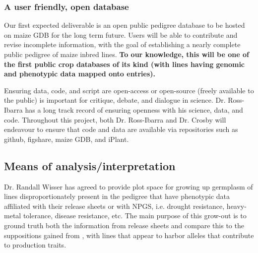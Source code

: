 \documentclass[12pt]{article}
\begin{document}
\subsubsection*{A user friendly, open database}

Our first expected deliverable is an open public pedigree database to be hosted on maize GDB for the long term future. Users will be able to contribute and revise incomplete information, with the goal of establishing a nearly complete public pedigree of maize inbred lines. \textbf{To our knowledge, this will be one of the first public crop databases of its kind (with lines having genomic and phenotypic data mapped onto entries).}
\par Ensuring data, code, and script are open-access or open-source (freely available to the public) is important for critique, debate, and dialogue in science. Dr. Ross-Ibarra has a long track record of ensuring openness with his science, data, and code. Throughout this project, both Dr. Ross-Ibarra and Dr. Crosby will endeavour to ensure that code and data are available via repositories such as github, figshare, maize GDB, and iPlant.


\subsection*{Means of analysis/interpretation}
Dr. Randall Wisser has agreed to provide plot space for growing up germplasm of lines disproportionately present in the pedigree that have phenotypic data affiliated with their release sheets or with NPGS, i.e. drought resistance, heavy-metal tolerance, disease resistance, etc. 
The main purpose of this grow-out is to ground truth both the information from release sheets and compare this to the suppositions gained from \citep{Berg:2014bs}, with lines that appear to harbor alleles that contribute to production traits.
\end{document}
